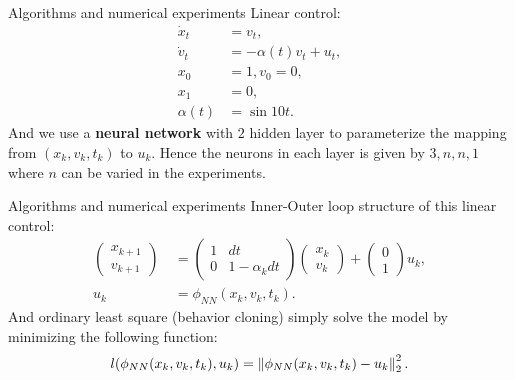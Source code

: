 \documentclass{beamer}
\begin{document}
\begin{frame}{Algorithms and numerical experiments}
	Linear control:
	\begin{equation}
    \begin{aligned}
        \dot{x}_t & = v_t, \\
        \dot{v}_t & = -\alpha(t) v_t + u_t,	\\
        	x_0 & = 1, v_0 = 0,		\\
	x_1 & = 0,			\\
	\alpha(t) & = \sin 10 t.
    \end{aligned}
\end{equation}
And we use a \textbf{neural network} with $2$ hidden layer to parameterize the mapping from $(x_k, v_k, t_k)$ to $u_k$. Hence the neurons in each layer is given by $3, n, n, 1$ where $n$ can be varied in the experiments.
\end{frame}


\begin{frame}{Algorithms and numerical experiments}
	Inner-Outer loop structure of this linear control:
	\begin{equation}
		\begin{aligned}
			\begin{pmatrix} x_{k+1} \\ v_{k+1}
			\end{pmatrix} & \ = \begin{pmatrix} 1 & dt \\ 0 & 1-\alpha_k dt
			\end{pmatrix}\begin{pmatrix} x_{k} \\ v_{k}
			\end{pmatrix} + \begin{pmatrix} 0 \\ 1
			\end{pmatrix}u_k,		\\
			u_k & \ = \phi_{NN}(x_k, v_k, t_k).
		\end{aligned}
	\end{equation}
	And ordinary least square (behavior cloning) simply solve the model by minimizing the following function:
	$$l(\phi_{NN}(x_k, v_k, t_k), u_k) = \left\| \phi_{NN}(x_k, v_k, t_k) - u_k \right\|_2^2.$$
\end{frame}
\end{document}
